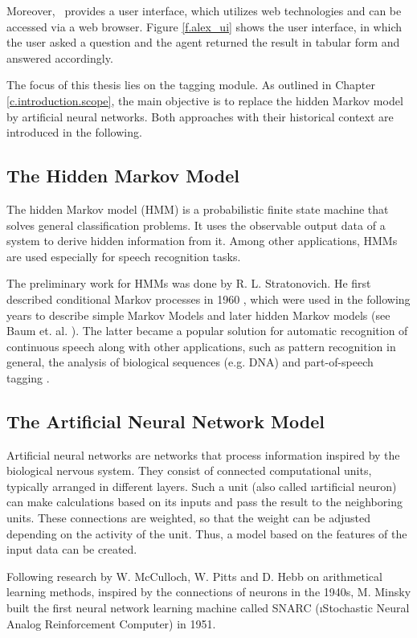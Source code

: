 Moreover, \Alex\ provides a user interface, which utilizes web technologies and can be accessed via a web browser. Figure \ref{f.alex_ui} shows the user interface, in which the user asked a question and the agent returned the result in tabular form and answered accordingly.

The focus of this thesis lies on the tagging module. As outlined in Chapter \ref{c.introduction.scope}, the main objective is to replace the hidden Markov model by artificial neural networks. Both approaches with their historical context are introduced in the following.

\subsection{The Hidden Markov Model}\label{c.introduction.related.hmm}
The hidden Markov model (HMM) is a probabilistic finite state machine that solves general classification problems. It uses the observable output data of a system to derive hidden information from it. Among other applications, HMMs are used especially for speech recognition tasks.

The preliminary work for HMMs was done by R. L. Stratonovich. He first described conditional Markov processes in 1960 \cite{stratonovich1960}, which were used in the following years to describe simple Markov Models and later hidden Markov models (see Baum et. al. \cite{baum1966}\cite{baum1967}). The latter became a popular solution for automatic recognition of continuous speech \cite{baker1975} along with other applications, such as pattern recognition in general, the analysis of biological sequences (e.g. DNA) \cite{bishop1986} and part-of-speech tagging \cite{kupiec1992}.

\subsection{The Artificial Neural Network Model}\label{c.introduction.related.nn}
Artificial neural networks are networks that process information inspired by the biological nervous system. They consist of connected computational units, typically arranged in different layers. Such a unit (also called \i{artificial neuron}) can make calculations based on its inputs and pass the result to the neighboring units. These connections are weighted, so that the weight can be adjusted depending on the activity of the unit. Thus, a model based on the features of the input data can be created.

Following research by W. McCulloch, W. Pitts \cite{mcculloch1943} and D. Hebb \cite{shaw1986} on arithmetical learning methods, inspired by the connections of neurons in the 1940s, M. Minsky built the first neural network learning machine called SNARC (\i{Stochastic Neural Analog Reinforcement Computer)}\cite{crevier1993} in 1951.

